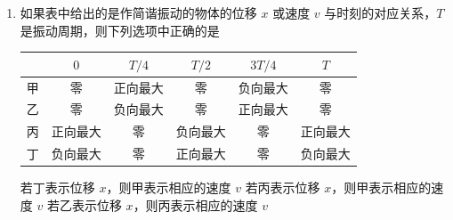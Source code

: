 \documentclass[\gkver]{gaokaozhenti}
\begin{document}
\begin{enumerate}
{然后逐项研究：

A 项：若碰后甲球速度为 0，即 $v_{\text{甲}}' = 0$，由①式得 $p_{\text{乙}}' = p_{\text{甲}} - p_{\text{乙}} > 0$，$v_{\text{乙}}' > 0$，故 A 正确。

B 项：若碰后乙球速度为 0，即 $v_{\text{乙}}' = 0$，由①式得 $p_{\text{甲}}' = p_{\text{甲}} - p_{\text{乙}} > 0$，$v_{\text{甲}}' > 0$，甲球将超越乙沿原方向运动，这是不符合事实的，故 B 错误。

C 项：两球速度均不为 0，由①式可见，若两球碰撞后速度方向相同，$p_{\text{甲}}' > 0$，$p_{\text{乙}}' > 0$，①式成立且符合事实，故 C 正确。

D 项：若两球碰撞后速度反向，动能不变，则必有 $p_{\text{甲}}' = -p_{\text{甲}}$，$p_{\text{乙}}' = -p_{\text{乙}}$，代入①式中得 $p_{\text{甲}} - p_{\text{乙}} = -p_{\text{甲}} + p_{\text{乙}}$，即 $2p_{\text{甲}} = 2p_{\text{乙}}$，$p_{\text{甲}} = p_{\text{乙}}$，显然与已知条件 $p_{\text{甲}} > p_{\text{乙}}$ 矛盾，故 D 错误。
}

\item
如果表中给出的是作简谐振动的物体的位移 $x$ 或速度 $v$ 与时刻的对应关系，$T$ 是振动周期，则下列选项中正确的是

\begin{center}
\begin{tabular}{|c|c|c|c|c|c|}
\hline
 & $0$ & $T/4$ & $T/2$ & $3T/4$ & $T$ \\
\hline
甲 & 零 & 正向最大 & 零 & 负向最大 & 零 \\
\hline
乙 & 零 & 负向最大 & 零 & 正向最大 & 零 \\
\hline
丙 & 正向最大 & 零 & 负向最大 & 零 & 正向最大 \\
\hline
丁 & 负向最大 & 零 & 正向最大 & 零 & 负向最大 \\
\hline
\end{tabular}
\end{center}
{若丁表示位移 $x$，则甲表示相应的速度 $v$}
{若丙表示位移 $x$，则甲表示相应的速度 $v$}
{若乙表示位移 $x$，则丙表示相应的速度 $v$}


\end{enumerate}
\end{document}
